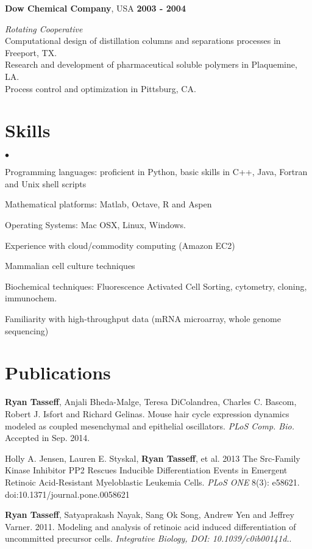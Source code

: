 \documentclass[margin,line]{res}
\newenvironment{list2}{
  \begin{list}{$\bullet$}{%
      \setlength{\itemsep}{0in}
      \setlength{\parsep}{0in} \setlength{\parskip}{0in}
      \setlength{\topsep}{0in} \setlength{\partopsep}{0in} 
      \setlength{\leftmargin}{0.2in}}}{\end{list}}
\begin{document}
\begin{resume}
{\bf Dow Chemical Company},  USA \hfill {\bf 2003 - 2004}

\vspace{-.35cm}
{\em Rotating Cooperative}\\
Computational design of distillation columns and separations processes in Freeport, TX.\\
Research and development of pharmaceutical soluble polymers in Plaquemine, LA.\\
Process control and optimization in Pittsburg, CA.  


\section{\sc Skills} 
\begin{list2}
\item Programming languages: proficient in Python, basic skills in C++, Java, Fortran and Unix shell scripts 
\item Mathematical platforms:  Matlab, Octave, R and Aspen
\item Operating Systems:  Mac OSX, Linux, Windows.
\item Experience with cloud/commodity computing (Amazon EC2)
\item Mammalian cell culture techniques
\item Biochemical techniques: Fluorescence Activated Cell Sorting, cytometry, cloning, immunochem.
\item Familiarity with high-throughput data (mRNA microarray, whole genome sequencing)
\end{list2}



\section{\sc Publications}
{\bf Ryan Tasseff}, Anjali Bheda-Malge, Teresa DiColandrea, Charles C. Bascom, Robert J. Isfort and Richard Gelinas.
Mouse hair cycle expression dynamics modeled as coupled mesenchymal and epithelial oscillators.  
{\it PLoS Comp. Bio. } Accepted in Sep. 2014. 

Holly A. Jensen, Lauren E. Styskal, {\bf Ryan Tasseff}, et al. 2013
The Src-Family Kinase Inhibitor PP2 Rescues Inducible Differentiation Events 
in Emergent Retinoic Acid-Resistant Myeloblastic Leukemia Cells.
{\it PLoS ONE} 8(3): e58621. doi:10.1371/journal.pone.0058621

{\bf Ryan Tasseff}, Satyaprakash Nayak, Sang Ok Song, Andrew Yen and Jeffrey Varner. 2011. 
Modeling and analysis of retinoic acid induced differentiation of uncommitted precursor cells.
{\it Integrative Biology, DOI: 10.1039/c0ib00141d.}. 


\end{resume}
\end{document}
